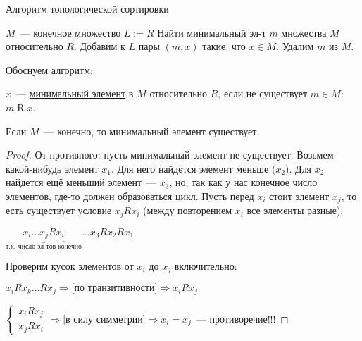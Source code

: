 \documentclass[russian]{lecture-notes}
\theoremstyle{definition}
\newcommand{\R}[2]{$#1\mathrel{R}#2$}
\begin{document}
\begin{algorithm}[H]
	\caption{Алгоритм топологической сортировки}\label{alg:topsort}
	\begin{algorithmic}[1]
		\State $M$~--- конечное множество
		\State $L:=R$
		\Statex
		\State Найти минимальный эл-т $m$ множества $M$ относительно $R$.
		\State Добавим к $L$ пары $(m,x)$ такие, что $x \in M$.
		\State Удалим $m$ из $M$.
		\EndWhile
	\end{algorithmic}
\end{algorithm}

Обоснуем алгоритм:

\begin{definition}
	\label{opr:min}
	$x$~--- \underline{минимальный элемент} в $M$ относительно $R$, если не существует $m \in M$: \R{m}{x}.
\end{definition}

\begin{lemma}
	\label{lem:min}
	Если $M$~--- конечно, то минимальный элемент существует.
\end{lemma}

\begin{proof}
	\label{proof:min}
	От противного: пусть минимальный элемент не существует. Возьмем какой-нибудь элемент $x_1$. Для него найдется элемент меньше ($x_2$). Для $x_2$ найдется ещё меньший элемент~--- $x_3$, но, так как у нас конечное число элементов, где-то должен образоваться цикл. Пусть перед $x_i$ стоит элемент $x_j$, то есть существует условие $x_jRx_i$ (между повторением $x_i$ все элементы разные).
	\begin{center}
		$\underbrace{x_i \dots x_jRx_i}_{\text{т.к. число эл-тов конечно}} \dots x_3Rx_2Rx_1$
	\end{center}
	Проверим кусок элементов от $x_i$ до $x_j$ включительно:
	\begin{center}
		$x_iRx_k \dots Rx_j \Rightarrow \text{[по транзитивности]} \Rightarrow x_iRx_j$
	\end{center}
	$\begin{cases}
		x_iRx_j
		\\
		x_jRx_i
	\end{cases} \Rightarrow \text{[в силу симметрии]} \Rightarrow x_i=x_j$~--- противоречие!!!
	
\end{proof}

\begin{example}
\end{example}
\end{document}
